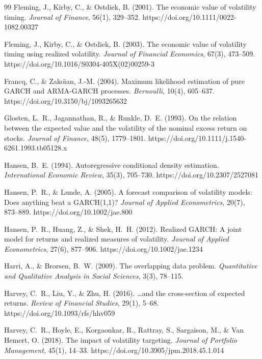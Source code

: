 \documentclass[12pt,a4paper]{article}
\begin{document}
\begin{thebibliography}{99}
Fleming, J., Kirby, C., \& Ostdiek, B. (2001). The economic value of volatility timing. \textit{Journal of Finance}, 56(1), 329--352. https://doi.org/10.1111/0022-1082.00327

Fleming, J., Kirby, C., \& Ostdiek, B. (2003). The economic value of volatility timing using realized volatility. \textit{Journal of Financial Economics}, 67(3), 473--509. https://doi.org/10.1016/S0304-405X(02)00259-3

Francq, C., \& Zako\"{\i}an, J.-M. (2004). Maximum likelihood estimation of pure GARCH and ARMA-GARCH processes. \textit{Bernoulli}, 10(4), 605--637. https://doi.org/10.3150/bj/1093265632

Glosten, L.~R., Jagannathan, R., \& Runkle, D.~E. (1993). On the relation between the expected value and the volatility of the nominal excess return on stocks. \textit{Journal of Finance}, 48(5), 1779--1801. https://doi.org/10.1111/j.1540-6261.1993.tb05128.x

Hansen, B.~E. (1994). Autoregressive conditional density estimation. \textit{International Economic Review}, 35(3), 705--730. https://doi.org/10.2307/2527081

Hansen, P.~R., \& Lunde, A. (2005). A forecast comparison of volatility models: Does anything beat a GARCH(1,1)? \textit{Journal of Applied Econometrics}, 20(7), 873--889. https://doi.org/10.1002/jae.800

Hansen, P.~R., Huang, Z., \& Shek, H.~H. (2012). Realized GARCH: A joint model for returns and realized measures of volatility. \textit{Journal of Applied Econometrics}, 27(6), 877--906. https://doi.org/10.1002/jae.1234

Harri, A., \& Brorsen, B.~W. (2009). The overlapping data problem. \textit{Quantitative and Qualitative Analysis in Social Sciences}, 3(3), 78--115.

Harvey, C.~R., Liu, Y., \& Zhu, H. (2016). \ldots and the cross-section of expected returns. \textit{Review of Financial Studies}, 29(1), 5--68. https://doi.org/10.1093/rfs/hhv059

Harvey, C.~R., Hoyle, E., Korgaonkar, R., Rattray, S., Sargaison, M., \& Van Hemert, O. (2018). The impact of volatility targeting. \textit{Journal of Portfolio Management}, 45(1), 14--33. https://doi.org/10.3905/jpm.2018.45.1.014


\end{thebibliography}
\end{document}
